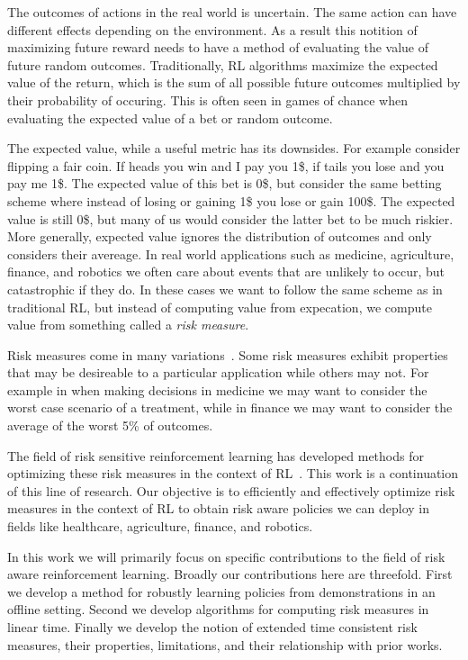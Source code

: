 \documentclass[12pt,letterpaper,oneside]{report}
\let\cite\citep  %
\theoremstyle{plain}
\theoremstyle{definition}
\theoremstyle{remark}
\begin{document}
The outcomes of actions in the real world is uncertain. The same action can have different effects depending on the environment. As a result this notition of maximizing future reward needs to have a method of evaluating the value of future random outcomes. Traditionally, RL algorithms maximize the expected value of the return, which is the sum of all possible future outcomes multiplied by their probability of occuring. This is often seen in games of chance when evaluating the expected value of a bet or random outcome.

The expected value, while a useful metric has its downsides. For example consider flipping a fair coin. If heads you win and I pay you 1\$, if tails you lose and you pay me 1\$. The expected value of this bet is 0\$, but consider the same betting scheme where instead of losing or gaining 1\$ you lose or gain 100\$. The expected value is still 0\$, but many of us would consider the latter bet to be much riskier. More generally, expected value ignores the distribution of outcomes and only considers their avereage. In real world applications such as medicine, agriculture, finance, and robotics we often care about events that are unlikely to occur, but catastrophic if they do. In these cases we want to follow the same scheme as in traditional RL, but instead of computing value from expecation, we compute value from something called a \emph{risk measure}.

Risk measures come in many variations~\cite{Follmer2016, rockafellar2002conditional, Shapiro2017}. Some risk measures exhibit properties that may be desireable to a particular application while others may not. For example in when making decisions in medicine we may want to consider the worst case scenario of a treatment, while in finance we may want to consider the average of the worst 5\% of outcomes.

The field of risk sensitive reinforcement learning has developed methods for optimizing these risk measures in the context of RL~\cite{Chow2015, chavez2026sample, Bauerle2011}. This work is a continuation of this line of research. Our objective is to efficiently and effectively optimize risk measures in the context of RL to obtain risk aware policies we can deploy in fields like healthcare, agriculture, finance, and robotics.

In this work we will primarily focus on specific contributions to the field of risk aware reinforcement learning. Broadly our contributions here are threefold. First we develop a method for robustly learning policies from demonstrations in an offline setting. Second we develop algorithms for computing risk measures in linear time. Finally we develop the notion of extended time consistent risk measures, their properties, limitations, and their relationship with prior works.
\end{document}
